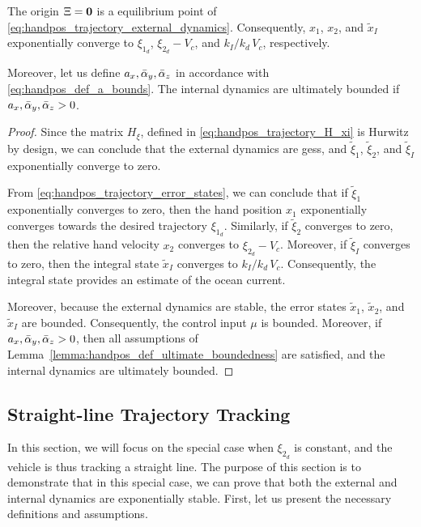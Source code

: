 \begin{prop}
    \label{prop:handpos_trajectory_trajectory_tracking}
    The origin $\Xi = \mathbf{0}$ is a  equilibrium point of \eqref{eq:handpos_trajectory_external_dynamics}.
    Consequently, $x_1$, $x_2$, and $\tilde{x}_I$ exponentially converge to $\xi_{1_d}$, $\xi_{2_d} - V_c$, and $k_I/k_d\,V_c$, respectively.

    Moreover, let us define $a_x, \Bar{\alpha}_y, \Bar{\alpha}_z$ in accordance with \eqref{eq:handpos_def_a_bounds}.
    The internal dynamics are ultimately bounded if $a_x, \Bar{\alpha}_y, \Bar{\alpha}_z > 0$.
\end{prop}
\begin{proof}
    Since the matrix $H_{\xi}$, defined in \eqref{eq:handpos_trajectory_H_xi} is Hurwitz by design, we can conclude that the external dynamics are \glspl{ges}, and $\tilde{\xi}_1$, $\tilde{\xi}_2$, and $\tilde{\xi}_I$ exponentially converge to zero.

    From \eqref{eq:handpos_trajectory_error_states}, we can conclude that if $\tilde{\xi}_1$ exponentially converges to zero, then the hand position $x_1$ exponentially converges towards the desired trajectory $\xi_{1_d}$.
    Similarly, if $\tilde{\xi}_2$ converges to zero, then the relative hand velocity $x_2$ converges to $\xi_{2_d} - V_c$.
    Moreover, if $\tilde{\xi}_I$ converges to zero, then the integral state $\tilde{x}_I$ converges to $k_I/k_d\,V_c$.
    Consequently, the integral state provides an estimate of the ocean current.

    Moreover, because the external dynamics are stable, the error states $\tilde{x}_1$, $\tilde{x}_2$, and $\tilde{x}_I$ are bounded.
    Consequently, the control input $\mu$ is bounded.
    Moreover, if $a_x, \Bar{\alpha}_y, \Bar{\alpha}_z > 0$, then all assumptions of Lemma~\ref{lemma:handpos_def_ultimate_boundedness} are satisfied, and the internal dynamics are ultimately bounded.
\end{proof}

\subsection{Straight-line Trajectory Tracking}
\label{sec:handpos_trajectory_straight_line_trajectory}
In this section, we will focus on the special case when $\xi_{2_d}$ is constant, and the vehicle is thus tracking a straight line.
The purpose of this section is to demonstrate that in this special case, we can prove that both the external and internal dynamics are exponentially stable.
First, let us present the necessary definitions and assumptions.

